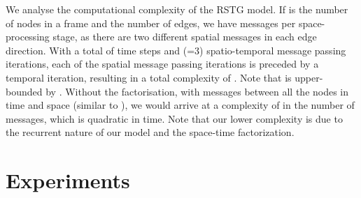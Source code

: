 \documentclass{article}
\begin{document}
We analyse the computational complexity of the RSTG model. 
If  is the number of nodes in a frame and  the number of edges, we have  messages per space-processing stage, as there are two different spatial messages in each edge direction.
With a total of  time steps and  (=3) spatio-temporal message passing iterations, 
each of the   spatial message passing iterations is preceded by a temporal iteration, resulting in a total complexity of . Note that  is upper-bounded by .
Without the factorisation, with messages between all the nodes in time and space (similar to \cite{wang2018non_local, wang2018videos_gupta2}), we would arrive at a complexity of  in the number of messages, which is quadratic in time.
Note that our lower complexity is due to the recurrent nature of our model and the space-time factorization.



\section{Experiments}
\end{document}
